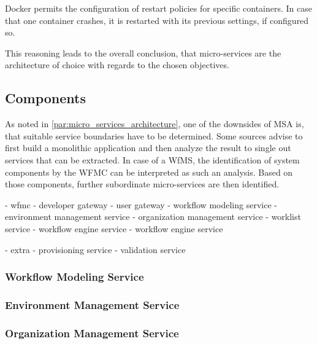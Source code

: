     Docker permits the configuration of restart policies for specific containers. In case that one container crashes, it is restarted with its previous settings, if configured so.

    This reasoning leads to the overall conclusion, that micro-services are the architecture of choice with regards to the chosen objectives.


\subsection{Components} %
\label{sub:components}
  As noted in \ref{par:micro_services_architecture}, one of the downsides of \ac{MSA} is, that suitable service boundaries have to be determined. Some sources advise to first build a monolithic application and then analyze the result to single out services that can be extracted. In case of a \ac{WfMS}, the identification of system components by the \ac{WFMC} can be interpreted as such an analysis. Based on those components, further subordinate micro-services are then identified.

  - wfmc
    - developer gateway
    - user gateway
    - workflow modeling service
    - environment management service
    - organization management service
    - worklist service
    - workflow engine service
    - workflow engine service

  - extra
    - provisioning service
    - validation service

  \subsubsection{Workflow Modeling Service} %
    \label{ssub:workflow_modeling_service}

  \subsubsection{Environment Management Service} %
    \label{ssub:environment_management_service}

  \subsubsection{Organization Management Service} %
    \label{ssub:organization_management_service}


